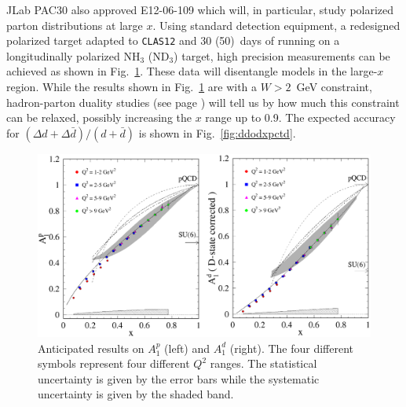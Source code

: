 JLab PAC30 also approved E12-06-109 \cite{EG12} which will, in particular,
study polarized parton distributions at large $x$. Using standard detection 
equipment, a redesigned polarized target adapted to {\tt CLAS12} and 30 
(50)~days of running on a longitudinally polarized NH$_3$ (ND$_3$) target, 
high precision measurements can be achieved as shown in Fig.~\ref{fig:A1xpctd}. 
These data will disentangle models in the large-$x$ region.  While the results 
shown in Fig.~\ref{fig:A1xpctd} are with a $W>2$~GeV constraint, hadron-parton 
duality studies (see page \pageref{duality}) will tell us by how much this 
constraint can be relaxed, possibly increasing the $x$ range up to 0.9.  The 
expected accuracy for $(\Delta d+ \Delta\bar{d})/(d+\bar{d})$ is 
shown in Fig.~\ref{fig:ddodxpctd}.
 
\begin{figure}[ht!]
\begin{center}
\centerline{\includegraphics[scale=0.25, angle=0]{../strucfunc/A1_xpctd.eps}}
\end{center}
\vspace*{-1cm}
\caption{\small{Anticipated results on $A_1^p$ (left) and $A_1^d$ (right).
The four different symbols represent four different $Q^2$ ranges.  The 
statistical uncertainty is given by the error bars while the systematic 
uncertainty is given by the shaded band.}}
\label{fig:A1xpctd}
\end{figure}

